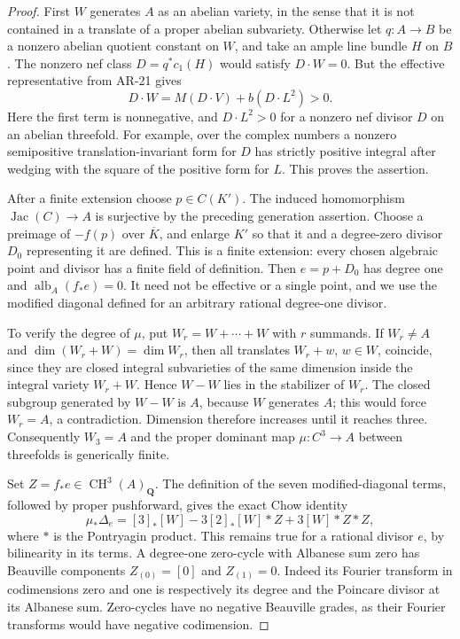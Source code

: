 \documentclass[11pt,a4paper]{article}
\begin{document}
\begin{proof}
First $W$ generates $A$ as an abelian variety, in the sense that it
is not contained in a translate of a proper abelian subvariety.
Otherwise let $q:A\to B$ be a nonzero abelian quotient constant on
$W$, and take an ample line bundle $H$ on $B$.  The nonzero nef class
$D=q^*c_1(H)$ would satisfy $D\cdot W=0$.  But the effective
representative from AR-21 gives
\[
 D\cdot W=M(D\cdot V)+b(D\cdot L^2)>0.
\]
Here the first term is nonnegative, and $D\cdot L^2>0$ for a nonzero
nef divisor $D$ on an abelian threefold.  For example, over the
complex numbers a nonzero semipositive translation-invariant form
for $D$ has strictly positive integral after wedging with the square
of the positive form for $L$.  This proves the assertion.

After a finite extension choose $p\in C(K')$.  The induced homomorphism
$\operatorname{Jac}(C)\to A$ is surjective by the preceding
generation assertion.  Choose a preimage of $-f(p)$ over
$\overline K$, and enlarge $K'$ so that it and a degree-zero divisor
$D_0$ representing it are defined.  This is a finite extension:
every chosen algebraic point and divisor has a finite field of
definition.  Then $e=p+D_0$ has degree one and
$\operatorname{alb}_A(f_*e)=0$.  It need not be effective or a
single point, and we use the modified diagonal defined for an
arbitrary rational degree-one divisor.

To verify the degree of $\mu$, put $W_r=W+\cdots+W$ with $r$ summands.
If $W_r\ne A$ and $\dim(W_r+W)=\dim W_r$, then all translates
$W_r+w$, $w\in W$, coincide, since they are closed integral
subvarieties of the same dimension inside the integral variety
$W_r+W$.  Hence $W-W$ lies in the stabilizer of $W_r$.  The closed
subgroup generated by $W-W$ is $A$, because $W$ generates $A$;
this would force $W_r=A$, a contradiction.  Dimension therefore
increases until it reaches three.  Consequently $W_3=A$ and the
proper dominant map $\mu:C^3\to A$ between threefolds is
generically finite.

Set $Z=f_*e\in\operatorname{CH}^3(A)_\mathbf Q$.  The definition of
the seven modified-diagonal terms, followed by proper pushforward,
gives the exact Chow identity
\[
 \mu_*\Delta_e=[3]_*[W]
            -3[2]_*[W]*Z+3[W]*Z*Z,                    \tag{AR.24d}
\]
where $*$ is the Pontryagin product.  This remains true for a
rational divisor $e$, by bilinearity in its terms.  A degree-one
zero-cycle with Albanese sum zero has Beauville components
$Z_{(0)}=[0]$ and $Z_{(1)}=0$.  Indeed its Fourier transform in
codimensions zero and one is respectively its degree and the
Poincare divisor at its Albanese sum.  Zero-cycles have no negative
Beauville grades, as their Fourier transforms would have negative
codimension.


\end{proof}
\end{document}
